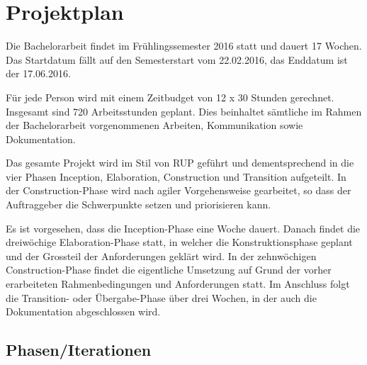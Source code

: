 \chapter{Projektplan}
\label{appendix:project_plan}

Die Bachelorarbeit findet im Frühlingssemester 2016 statt und dauert 17 Wochen. Das Startdatum fällt auf den Semesterstart vom 22.02.2016, das Enddatum ist der 17.06.2016.

Für jede Person wird mit einem Zeitbudget von 12 x 30 Stunden gerechnet. Insgesamt sind 720 Arbeitsstunden geplant. Dies beinhaltet sämtliche im Rahmen der Bachelorarbeit vorgenommenen Arbeiten, Kommunikation sowie Dokumentation.

Das gesamte Projekt wird im Stil von RUP geführt und dementsprechend in die vier Phasen Inception, Elaboration, Construction und Transition aufgeteilt. In der Construction-Phase wird nach agiler Vorgehensweise gearbeitet, so dass der Auftraggeber die Schwerpunkte setzen und priorisieren kann.

Es ist vorgesehen, dass die Inception-Phase eine Woche dauert. Danach findet die dreiwöchige Elaboration-Phase statt, in welcher die Konstruktionsphase geplant und der Grossteil der Anforderungen geklärt wird.
In der zehnwöchigen Construction-Phase findet die eigentliche Umsetzung auf Grund der vorher erarbeiteten Rahmenbedingungen und Anforderungen statt. Im Anschluss folgt die Transition- oder Übergabe-Phase über drei Wochen, in der auch die Dokumentation abgeschlossen wird.

\section*{Phasen/Iterationen}

